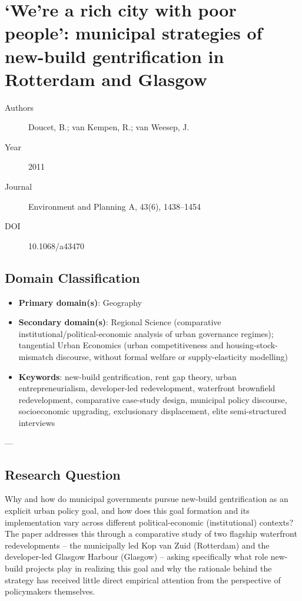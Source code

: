 \section{`We're a rich city with poor people': municipal strategies of new-build gentrification in Rotterdam and Glasgow}

\begin{description}
  \item[Authors] Doucet, B.; van Kempen, R.; van Weesep, J.
  \item[Year] 2011
  \item[Journal] Environment and Planning A, 43(6), 1438--1454
  \item[DOI] 10.1068/a43470
\end{description}

\subsection*{Domain Classification}

\begin{itemize}
  \item \textbf{Primary domain(s)}: Geography
  \item \textbf{Secondary domain(s)}: Regional Science (comparative institutional/political-economic analysis of urban governance regimes); tangential Urban Economics (urban competitiveness and housing-stock-mismatch discourse, without formal welfare or supply-elasticity modelling)
  \item \textbf{Keywords}: new-build gentrification, rent gap theory, urban entrepreneurialism, developer-led redevelopment, waterfront brownfield redevelopment, comparative case-study design, municipal policy discourse, socioeconomic upgrading, exclusionary displacement, elite semi-structured interviews
\end{itemize}

---

\subsection*{Research Question}

Why and how do municipal governments pursue new-build gentrification as an explicit urban policy goal, and how does this goal formation and its implementation vary across different political-economic (institutional) contexts? The paper addresses this through a comparative study of two flagship waterfront redevelopments -- the municipally led Kop van Zuid (Rotterdam) and the developer-led Glasgow Harbour (Glasgow) -- asking specifically what role new-build projects play in realizing this goal and why the rationale behind the strategy has received little direct empirical attention from the perspective of policymakers themselves.

